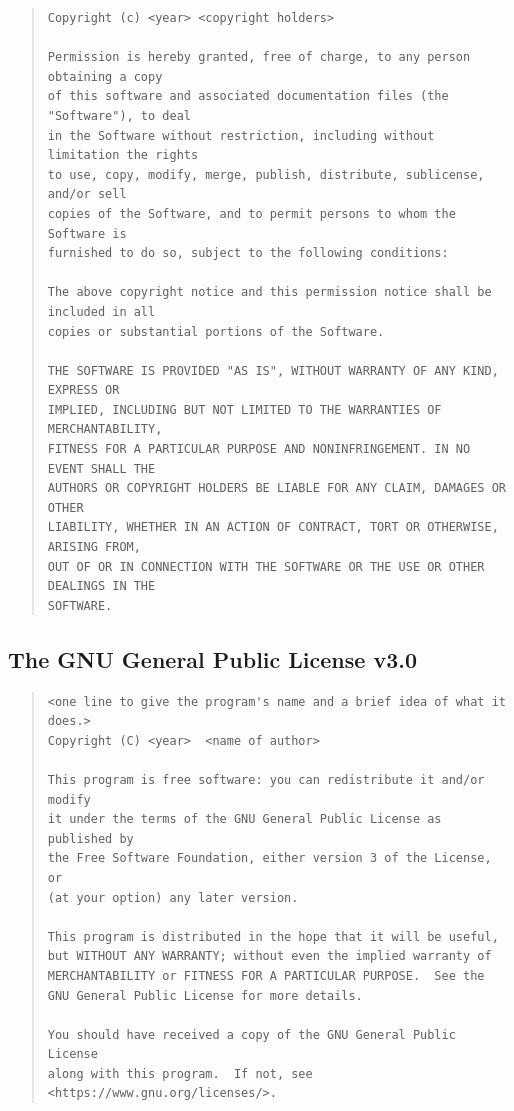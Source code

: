 \documentclass[12pt,a4paper]{article}
\begin{document}
\begin{quote}
\begin{verbatim}
Copyright (c) <year> <copyright holders>

Permission is hereby granted, free of charge, to any person obtaining a copy
of this software and associated documentation files (the "Software"), to deal
in the Software without restriction, including without limitation the rights
to use, copy, modify, merge, publish, distribute, sublicense, and/or sell
copies of the Software, and to permit persons to whom the Software is
furnished to do so, subject to the following conditions:

The above copyright notice and this permission notice shall be included in all
copies or substantial portions of the Software.

THE SOFTWARE IS PROVIDED "AS IS", WITHOUT WARRANTY OF ANY KIND, EXPRESS OR
IMPLIED, INCLUDING BUT NOT LIMITED TO THE WARRANTIES OF MERCHANTABILITY,
FITNESS FOR A PARTICULAR PURPOSE AND NONINFRINGEMENT. IN NO EVENT SHALL THE
AUTHORS OR COPYRIGHT HOLDERS BE LIABLE FOR ANY CLAIM, DAMAGES OR OTHER
LIABILITY, WHETHER IN AN ACTION OF CONTRACT, TORT OR OTHERWISE, ARISING FROM,
OUT OF OR IN CONNECTION WITH THE SOFTWARE OR THE USE OR OTHER DEALINGS IN THE
SOFTWARE.
\end{verbatim}
\cite{mit-license}
\end{quote}

\subsection{The GNU General Public License v3.0}

\begin{quote}
\begin{verbatim}
<one line to give the program's name and a brief idea of what it does.>
Copyright (C) <year>  <name of author>

This program is free software: you can redistribute it and/or modify
it under the terms of the GNU General Public License as published by
the Free Software Foundation, either version 3 of the License, or
(at your option) any later version.

This program is distributed in the hope that it will be useful,
but WITHOUT ANY WARRANTY; without even the implied warranty of
MERCHANTABILITY or FITNESS FOR A PARTICULAR PURPOSE.  See the
GNU General Public License for more details.

You should have received a copy of the GNU General Public License
along with this program.  If not, see <https://www.gnu.org/licenses/>.
\end{verbatim}
\cite{gplv3}
\end{quote}





\end{document}
